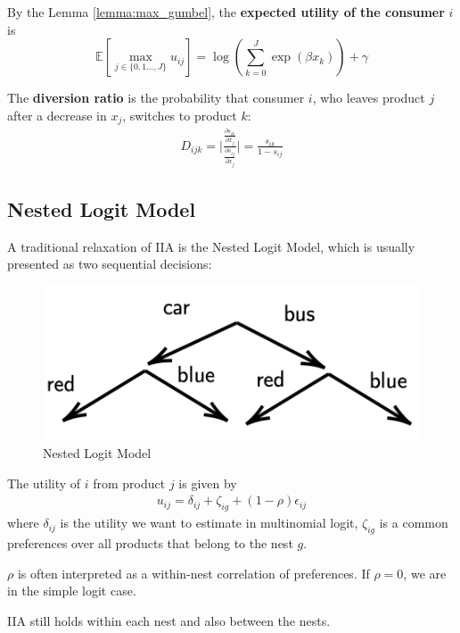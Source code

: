 \documentclass[11pt]{elegantbook}
\begin{document}
By the Lemma \ref{lemma:max_gumbel}, the \textbf{expected utility of the consumer} $i$ is $$\mathbb{E}[\max_{j\in\{0,1...,J\}} u_{ij}]=\log\left(\sum_{k=0}^{J}\exp\left(\beta x_k\right)\right)+\gamma$$

The \textbf{diversion ratio} is the probability that consumer $i$, who leaves product $j$ after a decrease in $x_j$, switches to product $k$:
\begin{equation}
    \begin{aligned}
        D_{ijk}=\bigg|\frac{\frac{\partial s_{ik}}{\partial x_j}}{\frac{\partial s_{ij}}{\partial x_j}}\bigg|=\frac{s_{ik}}{1-s_{ij}}
    \end{aligned}
    \nonumber
\end{equation}


\subsection{Nested Logit Model}
A traditional relaxation of IIA is the Nested Logit Model, which is usually presented as two sequential decisions:
\begin{figure}[htbp]
    \centering
    \includegraphics[scale=0.3]{Nest.png}
    \caption{Nested Logit Model}
    \label{}
\end{figure}
The utility of $i$ from product $j$ is given by
\begin{equation}
    \begin{aligned}
        u_{ij}=\delta_{ij}+\zeta_{ig}+(1-\rho)\epsilon_{ij}
    \end{aligned}
    \nonumber
\end{equation}
where $\delta_{ij}$ is the utility we want to estimate in multinomial logit, $\zeta_{ig}$ is a common preferences over all products that belong to the nest $g$.

$\rho$ is often interpreted as a within-nest correlation of preferences. If $\rho=0$, we are in the simple logit case.

\begin{note}
    IIA still holds within each nest and also between the nests.
\end{note}
\end{document}

